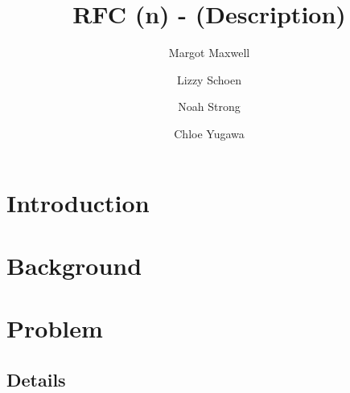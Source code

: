 \documentclass[12pt]{article}
\title{RFC (n) - (Description)}
\author{
	Margot Maxwell \and
	Lizzy Schoen \and
	Noah Strong \and
	Chloe Yugawa
}
\begin{document}
\maketitle

\tableofcontents{}

\section{Introduction}

\section{Background}

\section{Problem}

\subsection{Details}
\end{document}
